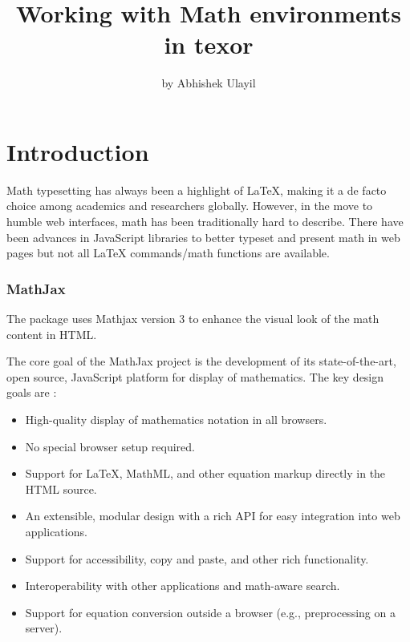 \title{Working with Math environments in texor}
\author{by Abhishek Ulayil}

\maketitle


\section{Introduction}
Math typesetting has always been a highlight of LaTeX, making it a de facto choice among academics and researchers globally. However, in the move to humble web interfaces, math has been traditionally hard to describe. There have been advances in JavaScript libraries to better typeset and present math in web pages but not all LaTeX commands/math functions are available.

\subsubsection{MathJax}
The  package uses Mathjax version 3 to enhance the visual look of the math content in HTML.

The core goal of the MathJax project is the development of its state-of-the-art, open source, JavaScript platform for display of mathematics. The key design goals are \citep{mathjax}:
\begin{itemize}
    \item High-quality display of mathematics notation in all browsers.
    \item No special browser setup required.
    \item Support for LaTeX, MathML, and other equation markup directly in the HTML source.
    \item An extensible, modular design with a rich API for easy integration into web applications.
    \item Support for accessibility, copy and paste, and other rich functionality.
    \item Interoperability with other applications and math-aware search.
    \item Support for equation conversion outside a browser (e.g., preprocessing on a server).
\end{itemize}

